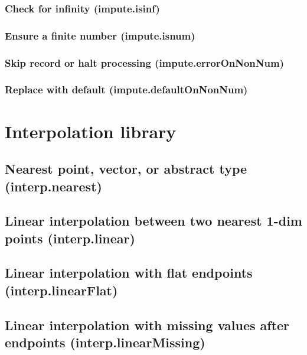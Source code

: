\documentclass{article}
\theoremstyle{definition}
\begin{document}
\subsubsection{Check for infinity (impute.isinf)}

\subsubsection{Ensure a finite number (impute.isnum)}

\subsubsection{Skip record or halt processing (impute.errorOnNonNum)}

\subsubsection{Replace with default (impute.defaultOnNonNum)}

\pagebreak

\section{Interpolation library}

\subsection{Nearest point, vector, or abstract type (interp.nearest)}

\subsection{Linear interpolation between two nearest 1-dim points (interp.linear)}

\subsection{Linear interpolation with flat endpoints (interp.linearFlat)}

\subsection{Linear interpolation with missing values after endpoints (interp.linearMissing)}
\end{document}
